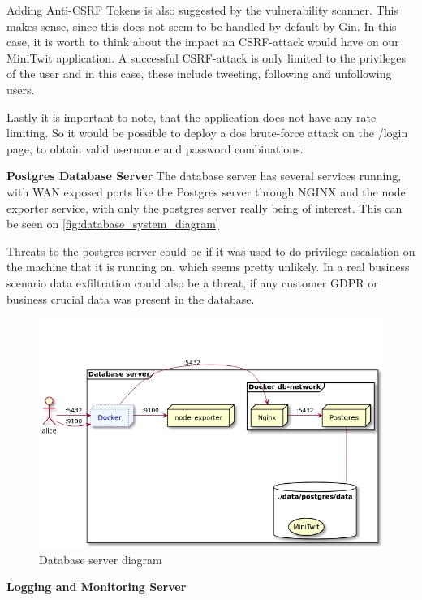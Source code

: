 Adding Anti-CSRF Tokens is also suggested by the vulnerability scanner. This makes sense, since this does not seem to be handled by default by Gin. In this case, it is worth to think about the impact an CSRF-attack would have on our MiniTwit application. A successful CSRF-attack is only limited to the privileges of the user and in this case, these include tweeting, following and unfollowing users.


Lastly it is important to note, that the application does not have any rate limiting. So it would be possible to deploy a \gls{dos} brute-force attack on the /login page, to obtain valid username and password combinations.

\textbf{Postgres Database Server}
The database server has several services running, with WAN exposed ports like the Postgres server through NGINX and the node exporter service, with only the postgres server really being of interest. This can be seen on \autoref{fig:database_system_diagram}

Threats to the postgres server could be if it was used to do privilege escalation on the machine that it is running on, which seems pretty unlikely. In a real business scenario data exfiltration could also be a threat, if any customer GDPR or business crucial data was present in the database. 

\begin{figure}[H]
    \centering
    \includegraphics[scale=0.4]{images/diagrams/database/database.jpg}
    \caption{Database server diagram}
    \label{fig:database_system_diagram}
\end{figure}

\textbf{Logging and Monitoring Server}

